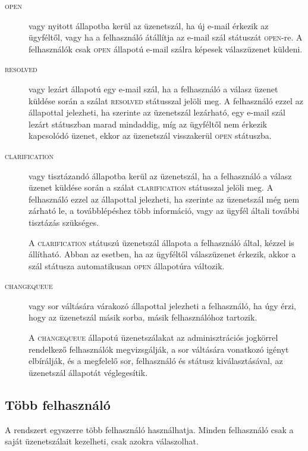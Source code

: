 \begin{description}
	\item[\textsc{open}] vagy nyitott állapotba kerül az üzenetszál, ha új e-mail érkezik az ügyféltől, vagy ha a felhasználó átállítja az e-mail szál státuszát \textsc{open}-re. A felhasználók csak \textsc{open} állapotú e-mail szálra képesek válaszüzenet küldeni.
	
	\item[\textsc{resolved}] vagy lezárt állapotú egy e-mail szál, ha a felhasználó a válasz üzenet küldése során a szálat \textsc{resolved} státusszal jelöli meg. A felhasználó ezzel az állapottal jelezheti, ha szerinte az üzenetszál lezárható, egy e-mail szál lezárt státuszban marad mindaddig, míg az ügyféltől nem érkezik kapcsolódó üzenet, ekkor az üzenetszál visszakerül \textsc{open} státuszba.
	
	\item[\textsc{clarification}] vagy tisztázandó állapotba kerül az üzenetszál, ha a felhasználó a válasz üzenet küldése során a szálat \textsc{clarification} státusszal jelöli meg. A felhasználó ezzel az állapottal jelezheti, ha szerinte az üzenetszál még nem zárható le, a továbblépéshez több információ, vagy az ügyfél általi további tisztázás szükséges.
	
	A \textsc{clarification} státuszú üzenetszál állapota a felhasználó által, kézzel is állítható. Abban az esetben, ha az ügyféltől válaszüzenet érkezik, akkor a szál státusza automatikusan \textsc{open} állapotúra változik.
	
	\item[\textsc{change\textunderscore queue}] vagy sor váltására várakozó állapottal jelezheti a felhasználó, ha úgy érzi, hogy az üzenetszál másik sorba, másik felhasználóhoz tartozik. 
	
	A \textsc{change\textunderscore queue} állapotú üzenetszálakat az adminisztrációs jogkörrel rendelkező felhasználók megvizsgálják, a sor váltására vonatkozó igényt elbírálják, és a megfelelő sor, felhasználó és státusz kiválasztásával, az üzenetszál állapotát véglegesítik.
	
\end{description}




\subsection{Több felhasználó}\label{sec:tobb_felhasznalo}
A rendszert egyszerre több felhasználó használhatja. Minden felhasználó csak a saját üzenetszálait kezelheti, csak azokra válaszolhat.

